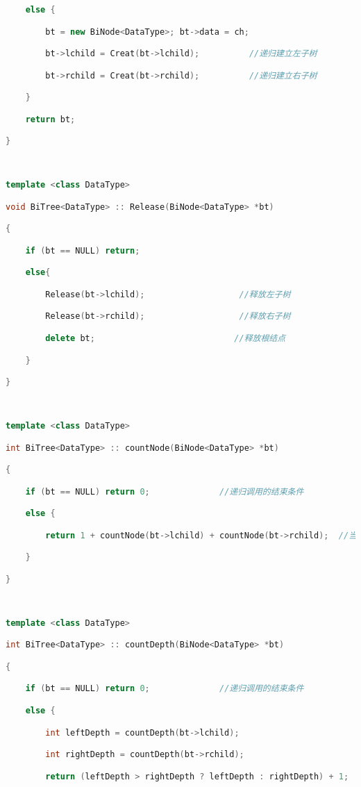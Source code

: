 \begin{lstlisting}[language=C++]
    else {

        bt = new BiNode<DataType>; bt->data = ch;        

        bt->lchild = Creat(bt->lchild);          //递归建立左子树

        bt->rchild = Creat(bt->rchild);          //递归建立右子树

    }

    return bt;

}

  

template <class DataType>

void BiTree<DataType> :: Release(BiNode<DataType> *bt)

{

    if (bt == NULL) return;

    else{

        Release(bt->lchild);                   //释放左子树

        Release(bt->rchild);                   //释放右子树

        delete bt;                            //释放根结点

    }

}

  

template <class DataType>

int BiTree<DataType> :: countNode(BiNode<DataType> *bt)

{

    if (bt == NULL) return 0;              //递归调用的结束条件

    else {

        return 1 + countNode(bt->lchild) + countNode(bt->rchild);  //当前节点(1) + 左子树节点数 + 右子树节点数

    }

}

  

template <class DataType>

int BiTree<DataType> :: countDepth(BiNode<DataType> *bt)

{

    if (bt == NULL) return 0;              //递归调用的结束条件

    else {

        int leftDepth = countDepth(bt->lchild);

        int rightDepth = countDepth(bt->rchild);

        return (leftDepth > rightDepth ? leftDepth : rightDepth) + 1;  //较深子树深度 + 1


\end{lstlisting}
